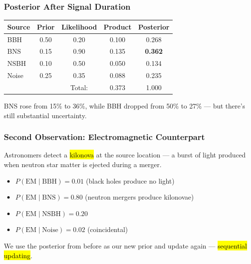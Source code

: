 \documentclass[slidestop,compress,mathserif]{beamer}
\begin{document}
\begin{frame}
    \frametitle{Posterior After Signal Duration}
    \begin{center}
    \renewcommand{\arraystretch}{1.3}
    \begin{tabular}{l c c c c}
    \toprule
    Source & Prior & Likelihood & Product & Posterior \\
    \midrule
    BBH  & 0.50 & 0.20 & 0.100 & 0.268 \\
    BNS  & 0.15 & 0.90 & 0.135 & \textbf{0.362} \\
    NSBH & 0.10 & 0.50 & 0.050 & 0.134 \\
    Noise & 0.25 & 0.35 & 0.088 & 0.235 \\
    \midrule
    & & Total: & 0.373 & 1.000 \\
    \bottomrule
    \end{tabular}
    \end{center}
    \pause

    \medskip
    BNS rose from 15\% to 36\%, while BBH dropped from 50\% to 27\% --- but there's still substantial uncertainty.
\end{frame}

\begin{frame}
    \frametitle{Second Observation: Electromagnetic Counterpart}
    Astronomers detect a \hl{kilonova} at the source location --- a burst of light produced when neutron star matter is ejected during a merger.
    \pause

    \medskip
    \begin{itemize}
        \item $P(\text{EM} \mid \text{BBH}) = 0.01$ \quad (black holes produce no light)
        \item $P(\text{EM} \mid \text{BNS}) = 0.80$ \quad (neutron mergers produce kilonovae)
        \item $P(\text{EM} \mid \text{NSBH}) = 0.20$
        \item $P(\text{EM} \mid \text{Noise}) = 0.02$ \quad (coincidental)
    \end{itemize}
    \pause

    \medskip
    We use the posterior from before as our new prior and update again --- \hl{sequential updating}.
\end{frame}
\end{document}
